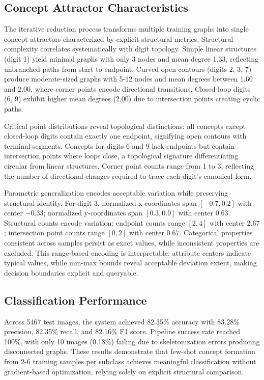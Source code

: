 \documentclass[a4paper,10pt]{article}
\begin{document}
\subsection{Concept Attractor Characteristics}

The iterative reduction process transforms multiple training graphs into single concept attractors characterized by explicit structural metrics. Structural complexity correlates systematically with digit topology. Simple linear structures (digit 1) yield minimal graphs with only 3 nodes and mean degree 1.33, reflecting unbranched paths from start to endpoint. Curved open contours (digits 2, 3, 7) produce moderate-sized graphs with 5-12 nodes and mean degrees between 1.60 and 2.00, where corner points encode directional transitions. Closed-loop digits (6, 9) exhibit higher mean degrees (2.00) due to intersection points creating cyclic paths.

Critical point distributions reveal topological distinctions: all concepts except closed-loop digits contain exactly one endpoint, signifying open contours with terminal segments. Concepts for digits 6 and 9 lack endpoints but contain intersection points where loops close, a topological signature differentiating circular from linear structures. Corner point counts range from 1 to 3, reflecting the number of directional changes required to trace each digit's canonical form.

Parametric generalization encodes acceptable variation while preserving structural identity. For digit 3, normalized x-coordinates span $[-0.7, 0.2]$ with center $-0.33$; normalized y-coordinates span $[0.3, 0.9]$ with center $0.63$. Structural counts encode variation: endpoint counts range $[2, 4]$ with center $2.67$; intersection point counts range $[0, 2]$ with center $0.67$. Categorical properties consistent across samples persist as exact values, while inconsistent properties are excluded. This range-based encoding is interpretable: attribute centers indicate typical values, while min-max bounds reveal acceptable deviation extent, making decision boundaries explicit and queryable.

\subsection{Classification Performance}

Across 5467 test images, the system achieved 82.35\% accuracy with 83.28\% precision, 82.35\% recall, and 82.16\% F1 score. Pipeline success rate reached 100\%, with only 10 images (0.18\%) failing due to skeletonization errors producing disconnected graphs. These results demonstrate that few-shot concept formation from 2-6 training samples per subclass achieves meaningful classification without gradient-based optimization, relying solely on explicit structural comparison.
\end{document}

